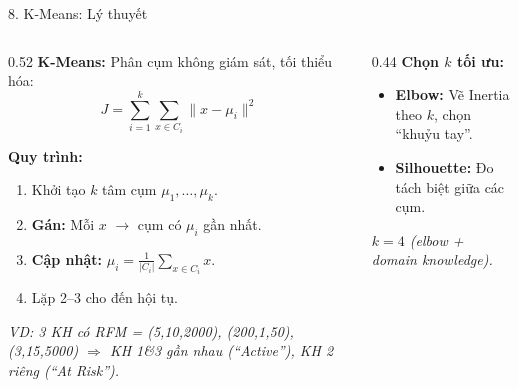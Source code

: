 \documentclass[10pt, aspectratio=169]{beamer}
\begin{document}
\begin{frame}{8. K-Means: Lý thuyết}
    \small
    \begin{columns}[T]
        \begin{column}{0.52\textwidth}
            \textbf{K-Means:} Phân cụm không giám sát, tối thiểu hóa:
            $$J = \sum_{i=1}^{k} \sum_{x \in C_i} \|x - \mu_i\|^2$$
            
            \textbf{Quy trình:}
            \begin{enumerate}
                \item Khởi tạo $k$ tâm cụm $\mu_1, \ldots, \mu_k$.
                \item \textbf{Gán:} Mỗi $x$ $\to$ cụm có $\mu_i$ gần nhất.
                \item \textbf{Cập nhật:} $\mu_i = \frac{1}{|C_i|}\sum_{x \in C_i} x$.
                \item Lặp 2--3 cho đến hội tụ.
            \end{enumerate}
            
            \footnotesize
            \textit{VD: 3 KH có RFM = (5,10,2000), (200,1,50), (3,15,5000) $\Rightarrow$ KH 1\&3 gần nhau (``Active''), KH 2 riêng (``At Risk'').}
        \end{column}
        
        \begin{column}{0.44\textwidth}
            \textbf{Chọn $k$ tối ưu:}
            \begin{itemize}
                \item \textbf{Elbow:} Vẽ Inertia theo $k$, chọn ``khuỷu tay''.
                \item \textbf{Silhouette:} Đo tách biệt giữa các cụm.
            \end{itemize}
            
            \vspace{0.1cm}
            \begin{center}
            \end{center}
            \textit{$k=4$ (elbow + domain knowledge).}
        \end{column}
    \end{columns}
\end{frame}
\end{document}
